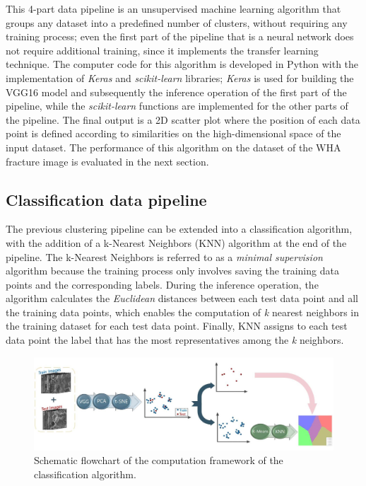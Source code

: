 \documentclass[authoryear,preprint,review,12pt, singleside]{elsarticle}
\begin{document}
This 4-part data pipeline is an unsupervised machine learning algorithm that groups any dataset into a predefined number of clusters, without requiring any training process; even the first part of the pipeline that is a neural network does not require additional training, since it implements the transfer learning technique. The computer code for this algorithm is developed in Python with the implementation of \textit{Keras} \citep{keras} and \textit{scikit-learn} \citep{sklearn} libraries; \textit{Keras} is used for building the VGG16 model and subsequently the inference operation of the first part of the pipeline, while the \textit{scikit-learn} functions are implemented for the other parts of the pipeline. The final output is a 2D scatter plot where the position of each data point is defined according to similarities on the high-dimensional space of the input dataset. The performance of this algorithm on the dataset of the WHA fracture image is evaluated in the next section. 

\subsection{Classification data pipeline}

The previous clustering pipeline can be extended into a classification algorithm, with the addition of a k-Nearest Neighbors (KNN) algorithm \citep{knn} at the end of the pipeline. The k-Nearest Neighbors is referred to as a \textit{minimal supervision} algorithm because the training process only involves saving the training data points and the corresponding labels. During the inference operation, the algorithm calculates the \textit{Euclidean} distances between each test data point and all the training data points, which enables the computation of \textit{k} nearest neighbors in the training dataset for each test data point. Finally, KNN assigns to each test data point the label that has the most representatives among the \textit{k} neighbors.

\begin{figure}[!h]
	\centering
	\includegraphics[width=\linewidth]{classification_pipeline_2.jpg}
	\caption{Schematic flowchart of the computation framework of the classification algorithm.}
	\label{fig:classif_pipe}
\end{figure}
\end{document}
